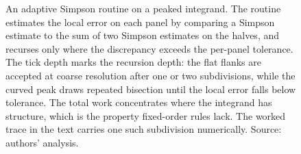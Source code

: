 \begin{figure}[ht]
\centering
{}
\caption[Adaptive-quadrature subdivision following the integrand]{An
adaptive Simpson routine on a peaked integrand. The routine estimates the
local error on each panel by comparing a Simpson estimate to the sum of two
Simpson estimates on the halves, and recurses only where the discrepancy
exceeds the per-panel tolerance. The tick depth marks the recursion depth:
the flat flanks are accepted at coarse resolution after one or two
subdivisions, while the curved peak draws repeated bisection until the local
error falls below tolerance. The total work concentrates where the integrand
has structure, which is the property fixed-order rules lack. The worked trace
in the text carries one such subdivision numerically. Source: authors'
analysis.}
\label{fig:vol02:ch16:adaptive-quadrature}
\end{figure}
